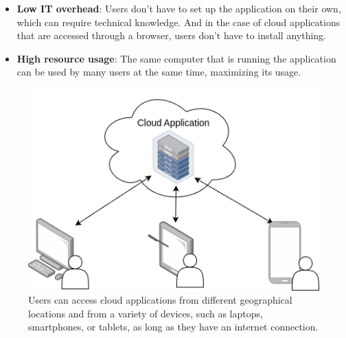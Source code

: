 \begin{itemize}
      \item \textbf{Low IT overhead}: Users don't have to set up the application on their own, which
	      can require technical knowledge.
        And in the case of cloud applications that are accessed through a browser,
        users don't have to install anything.

      \item \textbf{High resource usage}: The same computer that is running the
        application can be used by many users at the same time, maximizing its usage.

\end{itemize}

\begin{figure}[H]
	\centering
	\includegraphics[scale=0.41]{images/basic-cloud-services.drawio.png}
	\caption{Users can access cloud applications from different geographical locations and from a variety of devices, such as laptops, smartphones, or tablets, as long as they have an internet connection.}
	\label{fig:cloud-applications}
	\vspace{-2em} %
\end{figure}
\FloatBarrier

%


